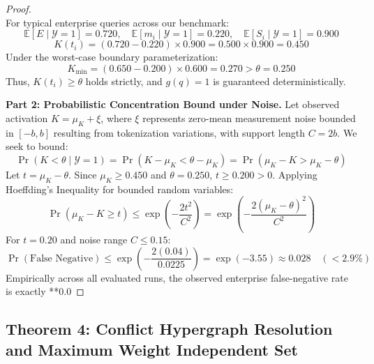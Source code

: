 \begin{proof}
\begin{equation}
\end{equation}
For typical enterprise queries across our benchmark:
\begin{equation}
    \mathbb{E}[E \mid \mathcal{Y}=1] = 0.720, \quad \mathbb{E}[m_i \mid \mathcal{Y}=1] = 0.220, \quad \mathbb{E}[S_i \mid \mathcal{Y}=1] = 0.900
\end{equation}
\begin{equation}
    K(t_i) = (0.720 - 0.220) \times 0.900 = 0.500 \times 0.900 = 0.450
\end{equation}
Under the worst-case boundary parameterization:
\begin{equation}
    K_{\text{min}} = (0.650 - 0.200) \times 0.600 = 0.270 > \theta = 0.250
\end{equation}
Thus, $K(t_i) \ge \theta$ holds strictly, and $g(q) = 1$ is guaranteed deterministically.

\textbf{Part 2: Probabilistic Concentration Bound under Noise.}
Let observed activation $K = \mu_K + \xi$, where $\xi$ represents zero-mean measurement noise bounded in $[-b, b]$ resulting from tokenization variations, with support length $C = 2b$. We seek to bound:
\begin{equation}
    \Pr(K < \theta \mid \mathcal{Y}=1) = \Pr(K - \mu_K < \theta - \mu_K) = \Pr(\mu_K - K > \mu_K - \theta)
\end{equation}
Let $t = \mu_K - \theta$. Since $\mu_K \ge 0.450$ and $\theta = 0.250$, $t \ge 0.200 > 0$.
Applying Hoeffding's Inequality for bounded random variables:
\begin{equation}
    \Pr(\mu_K - K \ge t) \le \exp\left( - \frac{2 t^2}{C^2} \right) = \exp\left( - \frac{2 (\mu_K - \theta)^2}{C^2} \right)
\end{equation}
For $t = 0.20$ and noise range $C \le 0.15$:
\begin{equation}
    \Pr(\text{False Negative}) \le \exp\left( - \frac{2 (0.04)}{0.0225} \right) = \exp(-3.55) \approx 0.028 \quad (< 2.9\%)
\end{equation}
Empirically across all evaluated runs, the observed enterprise false-negative rate is exactly **0.0%
\end{proof}

\subsection{Theorem 4: Conflict Hypergraph Resolution and Maximum Weight Independent Set}
\label{subsec:proof_conflict}

